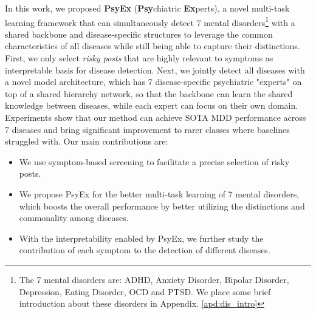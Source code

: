 In this work, we proposed \textbf{PsyEx} (\textbf{Psy}chiatric \textbf{Ex}perts), a novel multi-task learning framework that can simultaneously detect 7 mental disorders\footnote{The 7 mental disorders are: ADHD, Anxiety Disorder, Bipolar Disorder, Depression, Eating Disorder, OCD and PTSD. We place some brief introduction about these disorders in Appendix. \ref{apd:dis_intro}} with a shared backbone and disease-specific structures to leverage the common characteristics of all diseases while still being able to capture their distinctions. 
First, we only select \textit{risky posts} that are highly relevant to symptoms as interpretable basis for disease detection.
Next, we jointly detect all diseases with a novel model architecture, which has 7 disease-specific psychiatric "experts" on top of a shared hierarchy network, so that the backbone can learn the shared knowledge between diseases, while each expert can focus on their own domain. 
Experiments show that our method can achieve SOTA MDD performance across 7 diseases and bring significant improvement to rarer classes where baselines struggled with. 
Our main contributions are:
\begin{itemize}
    \item We use symptom-based screening to facilitate a precise selection of risky posts.
    \item We propose PsyEx for the better  multi-task learning of 7 mental disorders, which boosts the overall performance by better utilizing the distinctions and commonality among diseases. 
    \item With the interpretability enabled by PsyEx, we further study the contribution of each symptom to the detection of different diseases. 
\end{itemize}

